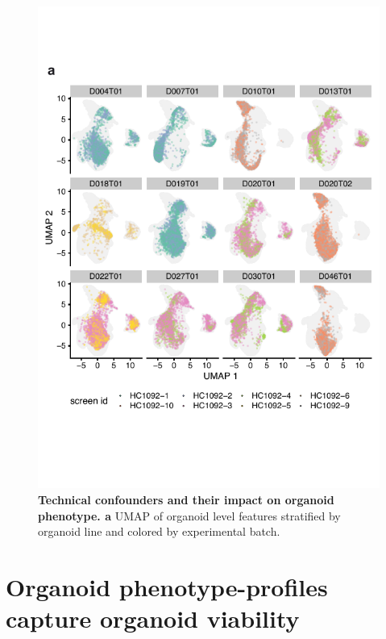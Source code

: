 \begin{flushleft}
\begin{figure}[h]
\centering
\includegraphics[width=\textwidth,
                height=\textheight,
                keepaspectratio]{figures/pdf/fig_150.pdf}
\caption{\textbf{Technical confounders and their impact on organoid phenotype. a} UMAP of organoid level features stratified by organoid line and colored by experimental batch.}
\label{fig_150}
\end{figure}
\clearpage


\section{Organoid phenotype-profiles capture organoid viability}


\end{flushleft}
